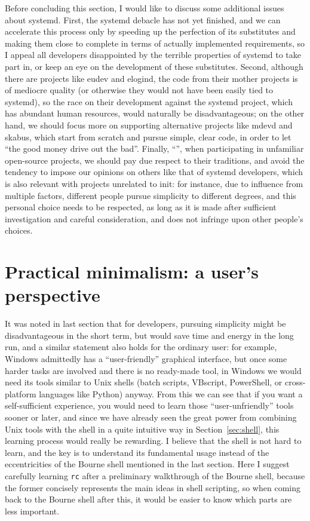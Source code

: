 Before concluding this section, I would like to discuss some additional issues
about systemd.  First, the systemd debacle has not yet finished, and we can
accelerate this process only by speeding up the perfection of its substitutes
and making them close to complete in terms of actually implemented requirements,
so I appeal all developers disappointed by the terrible properties of systemd
to take part in, or keep an eye on the development of these substitutes.
Second, although there are projects like eudev and elogind, the code from their
mother projects is of mediocre quality (or otherwise they would not have been
easily tied to systemd), so the race on their development against the systemd
project, which has abundant human resources, would naturally be disadvantageous;
on the other hand, we should focus more on supporting alternative projects
like mdevd and skabus, which start from scratch and pursue simple, clear code,
in order to let ``the good money drive out the bad''.  Finally, ``'', when participating in unfamiliar
open-source projects, we should pay due respect to their traditions, and avoid
the tendency to impose our opinions on others like that of systemd developers,
which is also relevant with projects unrelated to init: for instance, due
to influence from multiple factors, different people pursue simplicity
to different degrees, and this personal choice needs to be respected,
as long as it is made after sufficient investigation and careful
consideration, and does not infringe upon other people's choices.

\section{Practical minimalism: a user's perspective}\label{sec:user}

It was noted in last section that for developers, pursuing simplicity might be
disadvantageous in the short term, but would save time and energy in the long
run, and a similar statement also holds for the ordinary user: for example,
Windows admittedly has a ``user-friendly'' graphical interface, but once some
harder tasks are involved and there is no ready-made tool, in Windows we would
need its tools similar to Unix shells (batch scripts, VBscript, PowerShell,
or cross-platform languages like Python) anyway.  From this we can see that
if you want a self-sufficient experience, you would need to learn those
``user-unfriendly'' tools sooner or later, and since we have already seen the
great power from combining Unix tools with the shell in a quite intuitive way
in Section~\ref{sec:shell}, this learning process would really be rewarding.
I believe that the shell is not hard to learn, and the key is to understand
its fundamental usage instead of the eccentricities of the Bourne shell
mentioned in the last section.  Here I suggest carefully learning \verb|rc|%
 after a preliminary walkthrough of the Bourne shell,
because the former concisely represents the main ideas in shell scripting,
so when coming back to the Bourne shell after this, it would
be easier to know which parts are less important.

